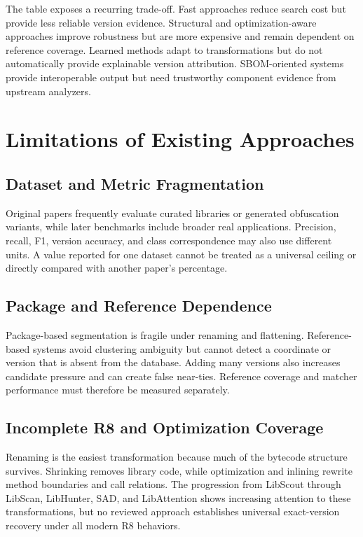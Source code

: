 The table exposes a recurring trade-off. Fast approaches reduce search cost
but provide less reliable version evidence. Structural and optimization-aware
approaches improve robustness but are more expensive and remain dependent on
reference coverage. Learned methods adapt to transformations but do not
automatically provide explainable version attribution. SBOM-oriented systems
provide interoperable output but need trustworthy component evidence from
upstream analyzers.

\section{Limitations of Existing Approaches}

\subsection{Dataset and Metric Fragmentation}

Original papers frequently evaluate curated libraries or generated
obfuscation variants, while later benchmarks include broader real
applications. Precision, recall, F1, version accuracy, and class
correspondence may also use different units. A value reported for one dataset
cannot be treated as a universal ceiling or directly compared with another
paper's percentage.

\subsection{Package and Reference Dependence}

Package-based segmentation is fragile under renaming and flattening.
Reference-based systems avoid clustering ambiguity but cannot detect a
coordinate or version that is absent from the database. Adding many versions
also increases candidate pressure and can create false near-ties. Reference
coverage and matcher performance must therefore be measured separately.

\subsection{Incomplete R8 and Optimization Coverage}

Renaming is the easiest transformation because much of the bytecode structure
survives. Shrinking removes library code, while optimization and inlining
rewrite method boundaries and call relations. The progression from LibScout
through LibScan, LibHunter, SAD, and LibAttention shows increasing attention
to these transformations, but no reviewed approach establishes universal
exact-version recovery under all modern R8 behaviors.

